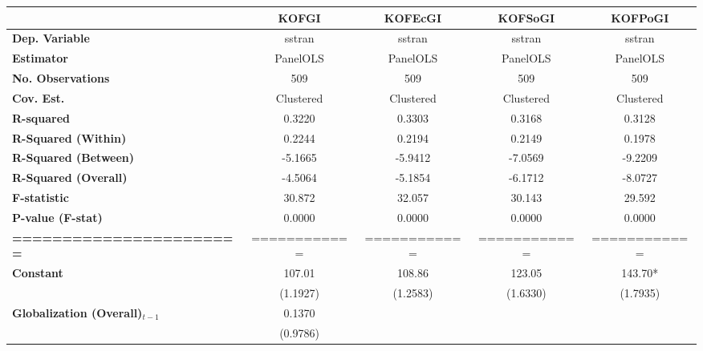 \begin{center}
\begin{tabular}{lcccc}
\toprule
                                   & \textbf{KOFGI} & \textbf{KOFEcGI} & \textbf{KOFSoGI} & \textbf{KOFPoGI}  \\
\midrule
\textbf{Dep. Variable}             &     sstran     &      sstran      &      sstran      &      sstran       \\
\textbf{Estimator}                 &    PanelOLS    &     PanelOLS     &     PanelOLS     &     PanelOLS      \\
\textbf{No. Observations}          &      509       &       509        &       509        &       509         \\
\textbf{Cov. Est.}                 &   Clustered    &    Clustered     &    Clustered     &    Clustered      \\
\textbf{R-squared}                 &     0.3220     &      0.3303      &      0.3168      &      0.3128       \\
\textbf{R-Squared (Within)}        &     0.2244     &      0.2194      &      0.2149      &      0.1978       \\
\textbf{R-Squared (Between)}       &    -5.1665     &     -5.9412      &     -7.0569      &     -9.2209       \\
\textbf{R-Squared (Overall)}       &    -4.5064     &     -5.1854      &     -6.1712      &     -8.0727       \\
\textbf{F-statistic}               &     30.872     &      32.057      &      30.143      &      29.592       \\
\textbf{P-value (F-stat)}          &     0.0000     &      0.0000      &      0.0000      &      0.0000       \\
\textbf{=======================}   &  ============  &   ============   &   ============   &   ============    \\
\textbf{Constant}                     &     107.01     &      108.86      &      123.05      &     143.70*       \\
\textbf{ }                         &    (1.1927)    &     (1.2583)     &     (1.6330)     &     (1.7935)      \\
\textbf{Globalization (Overall)$_{t-1}$}               &     0.1370     &                  &                  &                   \\
\textbf{ }                         &    (0.9786)    &                  &                  &                   \\

\end{tabular}
\end{center}
